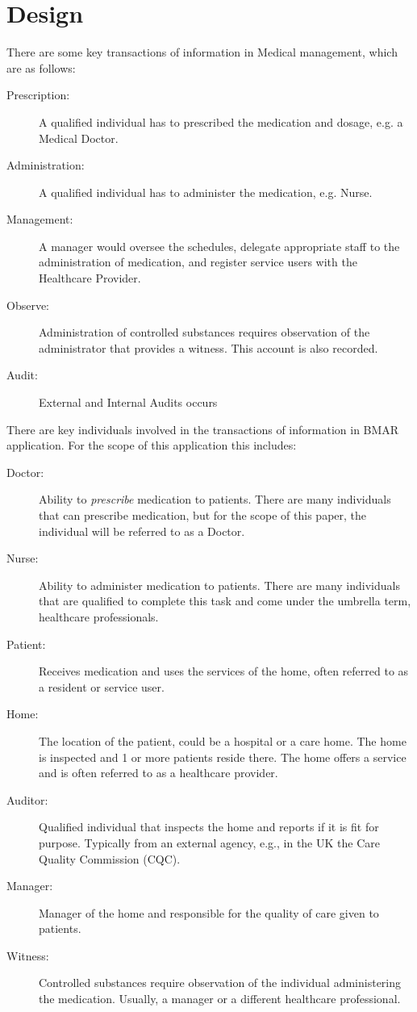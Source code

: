 \documentclass[runningheads]{llncs}
\begin{document}
\section{Design}
There are some key transactions of information in Medical management, which are as follows:
\begin{description}
	\item[Prescription:] A qualified individual has to prescribed the medication and dosage, e.g. a Medical Doctor. 	
	\item[Administration:] A qualified individual has to administer the medication, e.g. Nurse.
	\item[Management:] A manager would oversee the schedules, delegate appropriate staff to the administration of medication, and register service users with the Healthcare Provider. 
	\item[Observe:] Administration of controlled substances requires observation of the administrator that provides a witness. This account is also recorded.
	\item[Audit:] External and Internal Audits occurs
\end{description}

There are key individuals involved in the transactions of information in BMAR application. For the scope of this application this includes:
\begin{description}
	\item[Doctor:] Ability to {\em prescribe} medication to patients. There are many individuals that can prescribe medication, but for the scope of this paper, the individual will be referred to as a Doctor. 
	\item[Nurse:] Ability to administer medication to patients. There are many individuals that are qualified to complete this task and come under the umbrella term, healthcare professionals. 
	\item[Patient:] Receives medication and uses the services of the home, often referred to as a resident or service user.
	\item[Home:] The location of the patient, could be a hospital or a care home. The home is inspected and 1 or more patients reside there. The home offers a service and is often referred to as a healthcare provider. 
	\item[Auditor:] Qualified individual that inspects the home and reports if it is fit for purpose. Typically from an external agency, e.g., in the UK the Care Quality Commission (CQC). 
	\item[Manager:] Manager of the home and responsible for the quality of care given to patients.
	\item[Witness:] Controlled substances require observation of the individual administering the medication. Usually, a manager or a different healthcare professional.
\end{description}
\end{document}

